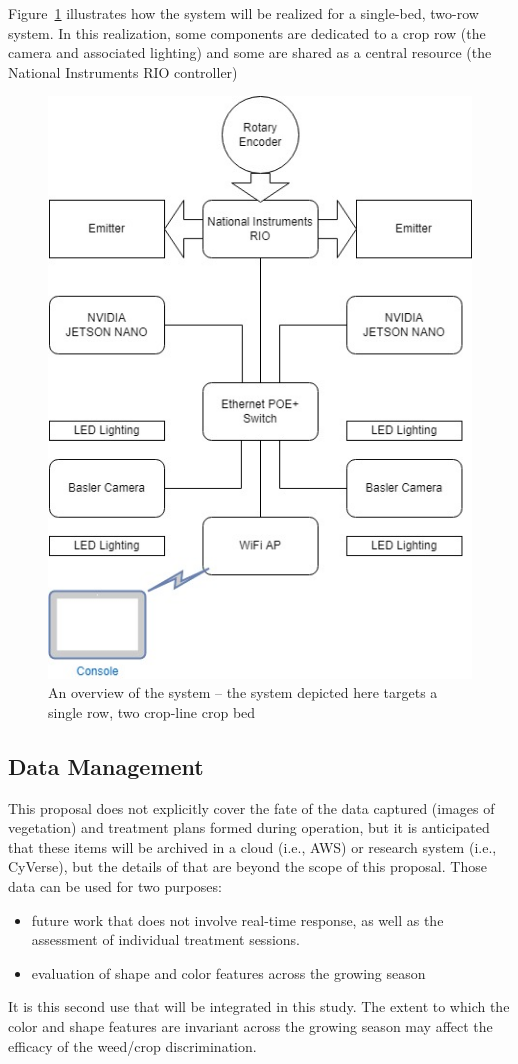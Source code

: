\documentclass[12pt]{article}
\begin{document}
{Figure~\ref{fig:system-overview} illustrates how the system will be realized for a single-bed, two-row system. In this realization, some components are dedicated to a crop row (the camera and associated lighting) and some are shared as a central resource (the National Instruments RIO controller)
\begin{figure}[H]
	\centering
	\includegraphics[width=0.4\linewidth]{./figures/system-overview.jpg}
	\caption[An overview of the system]{An overview of the system -- the system depicted here targets a single row, two crop-line crop bed}
	\label{fig:system-overview}
\end{figure}

\subsection{Data Management}
This proposal does not explicitly cover the fate of the data captured (images of vegetation) and treatment plans formed during operation, but it is anticipated that these items will be archived in a cloud (i.e., AWS) or research system (i.e., CyVerse), but the details of that are beyond the scope of this proposal. Those data can be used for two purposes:
\begin{itemize}
	\item{future work that does not involve real-time response, as well as the assessment of individual treatment sessions.}
	\item{evaluation of shape and color features across the growing season}
\end{itemize}
It is this second use that will be integrated in this study. The extent to which the color and shape features are invariant across the growing season may affect the efficacy of the weed/crop discrimination.

}
\end{document}
